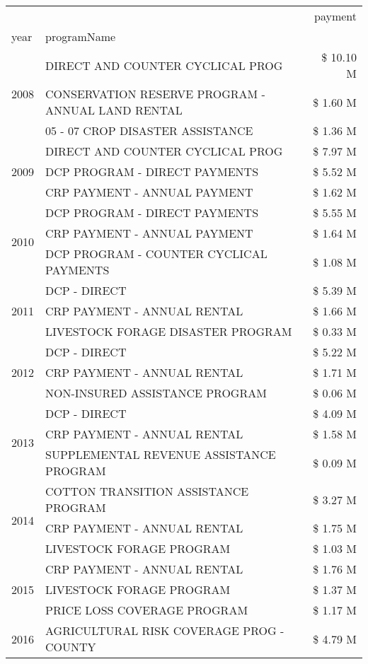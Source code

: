\begin{tabular}{llr}
\toprule
 &  & payment \\
year & programName &  \\
\midrule
\multirow[t]{3}{*}{2008} & DIRECT AND COUNTER CYCLICAL PROG & \$ 10.10 M \\
 & CONSERVATION RESERVE PROGRAM - ANNUAL LAND RENTAL & \$ 1.60 M \\
 & 05 - 07 CROP DISASTER ASSISTANCE & \$ 1.36 M \\
\cline{1-3}
\multirow[t]{3}{*}{2009} & DIRECT AND COUNTER CYCLICAL PROG & \$ 7.97 M \\
 & DCP PROGRAM - DIRECT PAYMENTS & \$ 5.52 M \\
 & CRP PAYMENT - ANNUAL PAYMENT & \$ 1.62 M \\
\cline{1-3}
\multirow[t]{3}{*}{2010} & DCP PROGRAM - DIRECT PAYMENTS & \$ 5.55 M \\
 & CRP PAYMENT - ANNUAL PAYMENT & \$ 1.64 M \\
 & DCP PROGRAM - COUNTER CYCLICAL PAYMENTS & \$ 1.08 M \\
\cline{1-3}
\multirow[t]{3}{*}{2011} & DCP - DIRECT & \$ 5.39 M \\
 & CRP PAYMENT - ANNUAL RENTAL & \$ 1.66 M \\
 & LIVESTOCK FORAGE DISASTER PROGRAM & \$ 0.33 M \\
\cline{1-3}
\multirow[t]{3}{*}{2012} & DCP - DIRECT & \$ 5.22 M \\
 & CRP PAYMENT - ANNUAL RENTAL & \$ 1.71 M \\
 & NON-INSURED ASSISTANCE PROGRAM & \$ 0.06 M \\
\cline{1-3}
\multirow[t]{3}{*}{2013} & DCP - DIRECT & \$ 4.09 M \\
 & CRP PAYMENT - ANNUAL RENTAL & \$ 1.58 M \\
 & SUPPLEMENTAL REVENUE ASSISTANCE PROGRAM & \$ 0.09 M \\
\cline{1-3}
\multirow[t]{3}{*}{2014} & COTTON TRANSITION ASSISTANCE PROGRAM & \$ 3.27 M \\
 & CRP PAYMENT - ANNUAL RENTAL & \$ 1.75 M \\
 & LIVESTOCK FORAGE PROGRAM & \$ 1.03 M \\
\cline{1-3}
\multirow[t]{3}{*}{2015} & CRP PAYMENT - ANNUAL RENTAL & \$ 1.76 M \\
 & LIVESTOCK FORAGE PROGRAM & \$ 1.37 M \\
 & PRICE LOSS COVERAGE PROGRAM & \$ 1.17 M \\
\cline{1-3}
\multirow[t]{3}{*}{2016} & AGRICULTURAL RISK COVERAGE PROG - COUNTY & \$ 4.79 M \\

\end{tabular}
